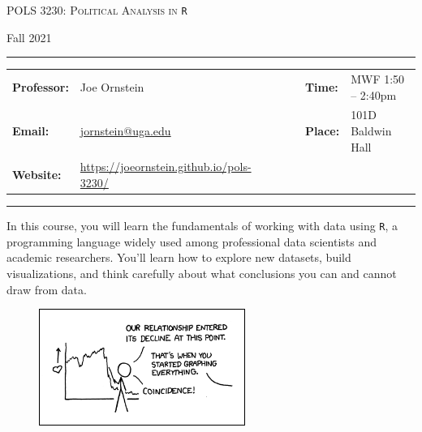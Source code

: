 \documentclass[11pt, letterpaper]{article}
\begin{document}
\begin{center}
{\Large \textsc{POLS 3230: Political Analysis in \texttt{R}}}
\end{center}
\begin{center}
{\large Fall 2021}
\end{center}

\begin{center}
\rule{6.5in}{0.4pt}
\begin{minipage}[t]{.96\textwidth}
\begin{tabular}{llcccll}
\textbf{Professor:} & Joe Ornstein & & &  & \textbf{Time:} & MWF 1:50 -- 2:40pm \\
\textbf{Email:} &  \href{mailto:jornstein@uga.edu}{jornstein@uga.edu} & & & & \textbf{Place:} & 101D Baldwin Hall\\
\textbf{Website:} & \href{https://joeornstein.github.io/pols-3230/}{https://joeornstein.github.io/pols-3230/} & & & & &
\end{tabular}
\end{minipage}
\rule{6.5in}{0.4pt}
\end{center}
\vspace{.15cm}
\setlength{\unitlength}{1in}
\renewcommand{\arraystretch}{2}

\noindent In this course, you will learn the fundamentals of working with data using \texttt{R}, a programming language widely used among professional data scientists and academic researchers. You'll learn how to explore new datasets, build visualizations, and think carefully about what conclusions you can and cannot draw from data.

\begin{figure}[h]
	\centering
	\href{https://xkcd.com/523/}{\includegraphics[width=0.6\textwidth]{img/decline.png}}
\end{figure}

\end{document}
